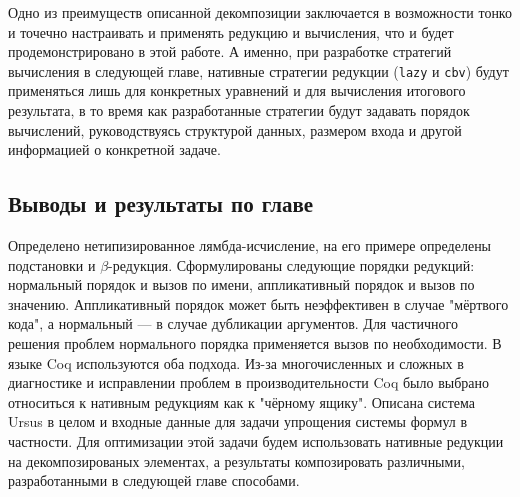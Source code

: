 \documentclass[../thesis.tex]{subfiles}
\begin{document}
Одно из преимуществ описанной декомпозиции заключается в возможности тонко и точечно настраивать и применять редукцию и вычисления, что и будет продемонстрировано в этой работе. А именно, при разработке стратегий вычисления в следующей главе, нативные стратегии редукции (\texttt{lazy} и \texttt{cbv}) будут применяться лишь для конкретных уравнений и для вычисления итогового результата, в то время как разработанные стратегии будут задавать порядок вычислений, руководствуясь структурой данных, размером входа и другой информацией о конкретной задаче.

\subsection{Выводы и результаты по главе}

Определено нетипизированное лямбда-исчисление, на его примере определены подстановки и $\beta$-редукция. Сформулированы следующие порядки редукций: нормальный порядок и вызов по имени, аппликативный порядок и вызов по значению. Аппликативный порядок может быть неэффективен в случае "мёртвого кода", а нормальный --- в случае дубликации аргументов. Для частичного решения проблем нормального порядка применяется вызов по необходимости. В языке Coq используются оба подхода. Из-за многочисленных и сложных в диагностике и исправлении проблем в производительности Coq было выбрано относиться к нативным редукциям как к "чёрному ящику". Описана система Ursus в целом и входные данные для задачи упрощения системы формул в частности. Для оптимизации этой задачи будем использовать нативные редукции на декомпозированых элементах, а результаты композировать различными, разработанными в следующей главе способами.
\end{document}
